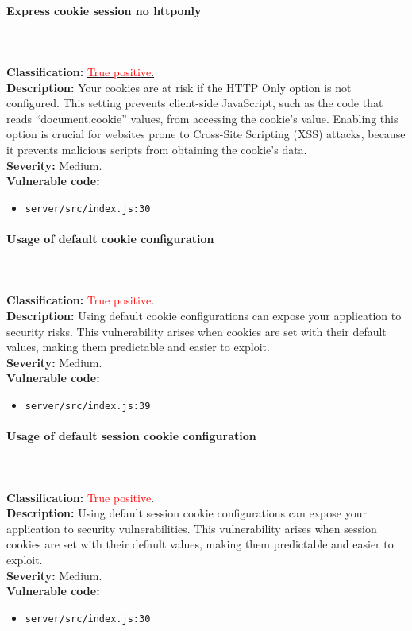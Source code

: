 \documentclass[]{article}
\begin{document}
\paragraph{Express cookie session no httponly} \mbox{} \\ \\
\textbf{Classification:} \hyperref[subsubsec:sensitive_cookie_without_secure_and_httponly_attributes]{\textcolor{red}{True} \textcolor{red}{positive}.} \\
\textbf{Description:} Your cookies are at risk if the HTTP Only option is not configured. This setting prevents client-side JavaScript, such as the code that reads ``document.cookie'' values, from accessing the cookie's value. Enabling this option is crucial for websites prone to Cross-Site Scripting (XSS) attacks, because it prevents malicious scripts from obtaining the cookie's data. \\ 
\textbf{Severity:} Medium. \\ 
\textbf{Vulnerable code:}
\begin{itemize}
    \item \texttt{server/src/index.js:30}
\end{itemize}

\paragraph{Usage of default cookie configuration} \mbox{} \\ \\
\textbf{Classification:} \textcolor{red}{True} \textcolor{red}{positive}. \\
\textbf{Description:} Using default cookie configurations can expose your application to security risks. This vulnerability arises when cookies are set with their default values, making them predictable and easier to exploit. \\ 
\textbf{Severity:} Medium. \\ 
\textbf{Vulnerable code:}
\begin{itemize}
    \item \texttt{server/src/index.js:39}
\end{itemize}

\paragraph{Usage of default session cookie configuration} \mbox{} \\ \\
\textbf{Classification:} \textcolor{red}{True} \textcolor{red}{positive}. \\
\textbf{Description:} Using default session cookie configurations can expose your application to security vulnerabilities. This vulnerability arises when session cookies are set with their default values, making them predictable and easier to exploit. \\ 
\textbf{Severity:} Medium. \\ 
\textbf{Vulnerable code:}
\begin{itemize}
    \item \texttt{server/src/index.js:30}
\end{itemize}
\end{document}
